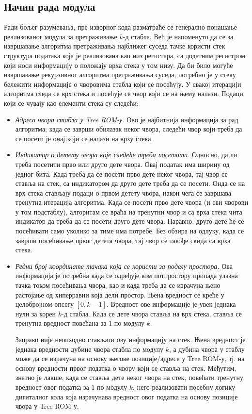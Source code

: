 \documentclass[master]{finthesis}
\newcommand*{\kd}{\texorpdfstring{$k$}{k}-д }
\begin{document}
\subsection{Начин рада модула}

Ради бољег разумевања, пре изворног кода разматраће се генерално понашање реализованог модула за претраживање \kd стабла. Већ је напоменуто да се за извршавање алгоритма претраживања најближег суседа тачке користи стек структура података која је реализована као низ регистара, са додатним регистром који носи информацију о положају врха стека у том низу. Да би било могуће извршавање рекурзивног алгоритма претраживања суседа, потребно је у стеку бележити информације о чворовима стабла који се посећују. У свакој итерацији алгоритма гледа се врх стека и посећује се чвор који се на њему налази. Подаци који се чувају као елементи стека су следећи:
\begin{itemize}
    \item \emph{Адреса чвора стабла у Tree ROM-у.} Ово је најбитнија информација за рад алгоритма; када се заврши обилазак неког чвора, следећи чвор који треба да се посети је онај који се налази на врху стека.
    \item \emph{Индикатор о детету чвора које следеће треба посетити.} Односно, да ли треба посетити прво или друго дете чвора. Овај податак има ширину од једног бита. Када треба да се посети прво дете неког чвора, тај чвор се ставља на стек, са индикатором да друго дете треба да се посети. Онда се на врх стека стављају подаци о првом детету чвора, након чега се завршава тренутна итерација алгоритма. Када се посети прво дете чвора (и сви чворови у том подстаблу), алгоритам се враћа на тренутни чвор и са врха стека чита индикатор да треба да се посети друго дете чвора. Наравно, друго дете ће се посећивати само уколико за тиме има потребе. Без обзира на одлуку, када се заврши посећивање првог детета чвора, тај чвор се такође скида са врха стека.
    \item \emph{Редни број координате тачака која се користи за поделу простора.} Ова информација је потребна када се одређује ком потпростору припада улазна тачка током посећивања чвора, као и када треба да се израчуна њено растојање од хиперравни која дели простор. Њена вредност се креће у целобројном опсегу $[0, k-1]$. Вредност ове информације је увек једнака нули за корен \kd стабла. Када се дете чвора ставља на врх стека, ставља се тренутна вредност повећана за $1$ по модулу $k$.

    Заправо није неопходно стављати ову информацију на стек. Њена вредност је једнака вредности дубине чвора стабла по модулу $k$, а дубина чвора у стаблу може да се израчуна на основу његове позиције\slash адресе у Tree ROM-у, тј. на основу вредности првог податка о чвору који се ставља на стек. Међутим, знатно је лакше, када се ставља дете неког чвора на стек, повећати тренутну вредност овог податка за $1$ по модулу $k$, него реализовати посебну логику дигиталног кола која израчунава вредност овог податка на основу позиције чвора у Tree ROM-у.
\end{itemize}
\end{document}
